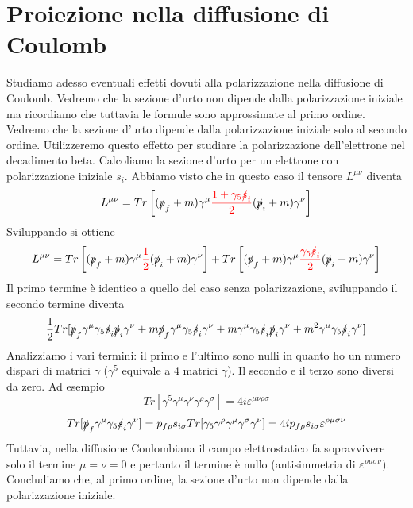 \section{Proiezione nella diffusione di Coulomb}
Studiamo adesso eventuali effetti dovuti alla polarizzazione nella diffusione di Coulomb. Vedremo che la sezione d'urto non dipende dalla polarizzazione iniziale ma ricordiamo che tuttavia le formule sono approssimate al primo ordine. Vedremo che la sezione d'urto dipende dalla polarizzazione iniziale solo al secondo ordine. Utilizzeremo questo effetto per studiare la polarizzazione dell'elettrone nel decadimento beta. Calcoliamo la sezione d'urto per un elettrone con polarizzazione iniziale $s_i$. Abbiamo visto che in questo caso il tensore $L^{\mu\nu}$ diventa
$$
L^{\mu\nu} = Tr\left[(\slashed{p}_f + m)\gamma^\mu \textcolor{red}{\frac{1 + \gamma_5 \slashed{s}_i}{2}} (\slashed{p}_i + m)\gamma^\nu\right]
$$
Sviluppando si ottiene
$$
L^{\mu\nu} = Tr\left[(\slashed{p}_f + m)\gamma^\mu \textcolor{red}{\frac{1}{2}} (\slashed{p}_i + m)\gamma^\nu\right] + Tr\left[(\slashed{p}_f + m)\gamma^\mu \textcolor{red}{\frac{\gamma_5 \slashed{s}_i}{2}} (\slashed{p}_i + m)\gamma^\nu\right]
$$
Il primo termine è identico a quello del caso senza polarizzazione, sviluppando il secondo termine diventa
$$
\frac{1}{2} Tr[\slashed{p}_f \gamma^\mu \gamma_5 \slashed{s}_i \slashed{p}_i \gamma^\nu + m\slashed{p}_f \gamma^\mu \gamma_5 \slashed{s}_i \gamma^\nu + m\gamma^\mu \gamma_5 \slashed{s}_i \slashed{p}_i \gamma^\nu + m^2\gamma^\mu \gamma_5 \slashed{s}_i \gamma^\nu]
$$
Analizziamo i vari termini: il primo e l'ultimo sono nulli in quanto ho un numero dispari di matrici $\gamma$ ($\gamma^5$ equivale a 4 matrici $\gamma$). Il secondo e il terzo sono diversi da zero. Ad esempio 
$$
Tr[\gamma^5 \gamma^\mu \gamma^\nu \gamma^\rho \gamma^\sigma] = 4i \varepsilon^{\mu\nu\rho\sigma}
$$
$$
Tr[\slashed{p}_f \gamma^\mu \gamma_5 \slashed{s}_i \gamma^\nu] = p_{f\rho} s_{i\sigma} Tr[\gamma_5 \gamma^\rho \gamma^\mu \gamma^\sigma \gamma^\nu] = 4i p_{f\rho} s_{i\sigma} \varepsilon^{\rho\mu\sigma\nu}
$$
Tuttavia, nella diffusione Coulombiana il campo elettrostatico fa sopravvivere solo il termine $\mu=\nu=0$ e pertanto il termine è nullo (antisimmetria di $\varepsilon^{\rho\mu\sigma\nu}$). Concludiamo che, al primo ordine, la sezione d'urto non dipende dalla polarizzazione iniziale.
